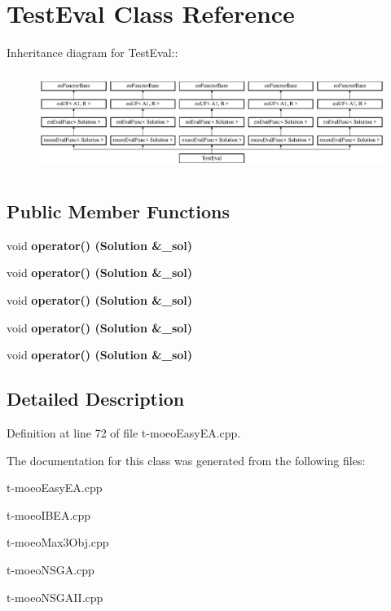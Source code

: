 \section{Test\-Eval Class Reference}
\label{classTestEval}
Inheritance diagram for Test\-Eval::\begin{figure}[H]
\begin{center}
\leavevmode
\includegraphics[height=3.23699cm]{classTestEval}
\end{center}
\end{figure}
\subsection*{Public Member Functions}
\begin{CompactItemize}
\item 
void \bf{operator()} (\bf{Solution} \&\_\-sol)\label{classTestEval_9572c868f92fafc149e6da9bcfa7b06b}

\item 
void \bf{operator()} (\bf{Solution} \&\_\-sol)\label{classTestEval_9572c868f92fafc149e6da9bcfa7b06b}

\item 
void \bf{operator()} (\bf{Solution} \&\_\-sol)\label{classTestEval_9572c868f92fafc149e6da9bcfa7b06b}

\item 
void \bf{operator()} (\bf{Solution} \&\_\-sol)\label{classTestEval_9572c868f92fafc149e6da9bcfa7b06b}

\item 
void \bf{operator()} (\bf{Solution} \&\_\-sol)\label{classTestEval_9572c868f92fafc149e6da9bcfa7b06b}

\end{CompactItemize}


\subsection{Detailed Description}




Definition at line 72 of file t-moeo\-Easy\-EA.cpp.

The documentation for this class was generated from the following files:\begin{CompactItemize}
\item 
t-moeo\-Easy\-EA.cpp\item 
t-moeo\-IBEA.cpp\item 
t-moeo\-Max3Obj.cpp\item 
t-moeo\-NSGA.cpp\item 
t-moeo\-NSGAII.cpp\end{CompactItemize}
